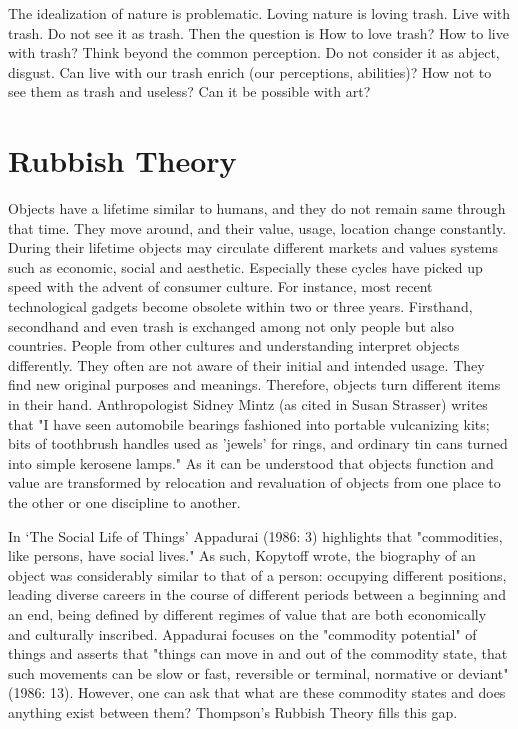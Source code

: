 
The idealization of nature is problematic. Loving nature is loving trash. Live with trash. Do not see it as trash. Then the question is How to love trash? How to live with trash? Think beyond the common perception. Do not consider it as abject, disgust. Can live with our trash enrich (our perceptions, abilities)? How not to see them as trash and useless? Can it be possible with art?





%
%
\section{Rubbish Theory}
Objects have a lifetime similar to humans, and they do not remain same through that time. They move around, and their value, usage, location change constantly. During their lifetime objects may circulate different markets and values systems such as economic, social and aesthetic. Especially these cycles have picked up speed with the advent of consumer culture. For instance, most recent technological gadgets become obsolete within two or three years. Firsthand, secondhand and even trash is exchanged among not only people but also countries. People from other cultures and understanding interpret objects differently. They often are not aware of their initial and intended usage. They find new original purposes and meanings. Therefore, objects turn different items in their hand. Anthropologist Sidney Mintz (as cited in Susan Strasser) writes that "I have seen automobile bearings fashioned into portable vulcanizing kits; bits of toothbrush handles used as 'jewels' for rings, and ordinary tin cans turned into simple kerosene lamps." As it can be understood that objects function and value are transformed by relocation and revaluation of objects from one place to the other or one discipline to another. 

In ‘The Social Life of Things’ Appadurai (1986: 3) highlights that "commodities, like persons, have social lives." As such, Kopytoff wrote, the biography of an object was considerably similar to that of a person: occupying different positions, leading diverse careers in the course of different periods between a beginning and an end, being defined by different regimes of value that are both economically and culturally inscribed. Appadurai focuses on the "commodity potential" of things and asserts that "things can move in and out of the commodity state, that such movements can be slow or fast, reversible or terminal, normative or deviant" (1986: 13). However, one can ask that what are these commodity states and does anything exist between them? Thompson’s Rubbish Theory fills this gap.

